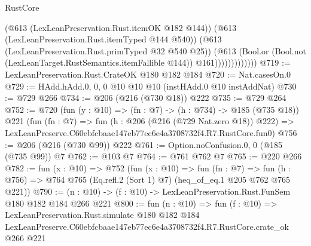 \begin{lexlean}{RustCore}
\begin{coremodule}
                          (@613 (LexLeanPreservation.Rust.itemOK @182 @144))
                          (@613 (LexLeanPreservation.Rust.itemTyped @144 @540))
                          (@613 (LexLeanPreservation.Rust.primTyped @32 @540 @25))
                          (@613
                            (Bool.or
                              (Bool.not (LexLeanTarget.RustSemantics.itemFallible @144))
                              @161)))))))))))))
@719 := LexLeanPreservation.Rust.CrateOK @180 @182 @184
@720 := Nat.casesOn.{0}
@729 := HAdd.hAdd.{0, 0, 0} @10 @10 @10 (instHAdd.{0} @10 instAddNat)
@730 := @729 @266
@734 := @206 (@216 (@730 @18)) @222
@735 := @729 @264
@752 := @720
    (fun (y : @10) => (fn : @7) -> (h : @734) -> @185 (@735 @18))
    @221
    (fun (fn : @7) =>
    fun (h : @206 (@216 (@729 Nat.zero @18)) @222) =>
    LexLeanPreserve.C60ebfcbaae147eb77ec6e4a3708732f4.R7.RustCore.fun0)
@756 := @206 (@216 (@730 @99)) @222
@761 := Option.noConfusion.{0, 0} (@185 (@735 @99)) @7
@762 := @103 @7
@764 := @761 @762 @7
@765 := @220 @266
@782 := fun (x : @10) =>
  @752
    (fun (x : @10) =>
    fun (fn : @7) =>
    fun (h : @756) => @764 @765 (Eq.refl.{2} (Sort 1) @7) (heq_of_eq.{1} @205 @762 @765 @221))
@790 := (n : @10) -> (f : @10) -> LexLeanPreservation.Rust.FunSem @180 @182 @184 @266 @221
@800 := fun (n : @10) =>
  fun (f : @10) =>
  LexLeanPreservation.Rust.simulate
    @180
    @182
    @184
    LexLeanPreserve.C60ebfcbaae147eb77ec6e4a3708732f4.R7.RustCore.crate_ok
    @266
    @221
\end{coremodule}
\end{lexlean}
